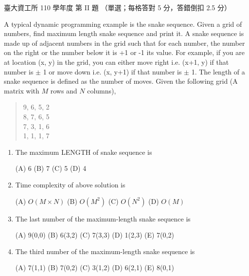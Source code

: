 \begin{pastexam}[label={px:ntu-110-dsaa-02}]{臺大資工所 110 學年度 第 II 題}
（單選；每格答對 5 分，答錯倒扣 2.5 分）

A typical dynamic programming example is the snake sequence. Given a grid of numbers, find
maximum length snake sequence and print it. A snake sequence is made up of adjacent numbers in
the grid such that for each number, the number on the right or the number below it is +1 or -1
its value. For example, if you are at location (x, y) in the grid, you can either move right
i.e. (x+1, y) if that number is $\pm$ 1 or move down i.e. (x, y+1) if that number is $\pm$ 1.
The length of a snake sequence is defined as the number of moves. Given the following grid (A
matrix with $M$ rows and $N$ columns),
\begin{quote}
9, 6, 5, 2\\
8, 7, 6, 5\\
7, 3, 1, 6\\
1, 1, 1, 7
\end{quote}
\begin{enumerate}[label=(\alph*)]
\item The maximum LENGTH of snake sequence is \underline{}

(A) 6 \qquad (B) 7 \qquad (C) 5 \qquad (D) 4
\item Time complexity of above solution is \underline{}

(A) $O(M\times N)$ \qquad (B) $O(M^2)$ \qquad (C) $O(N^2)$ \qquad (D) $O(M)$
\item The last number of the maximum-length snake sequence is \underline{}

(A) 9(0,0) \qquad (B) 6(3,2) \qquad (C) 7(3,3) \qquad (D) 1(2,3) \qquad (E) 7(0,2)
\item The third number of the maximum-length snake sequence is \underline{}

(A) 7(1,1) \qquad (B) 7(0,2) \qquad (C) 3(1,2) \qquad (D) 6(2,1) \qquad (E) 8(0,1)
\end{enumerate}
\end{pastexam}

